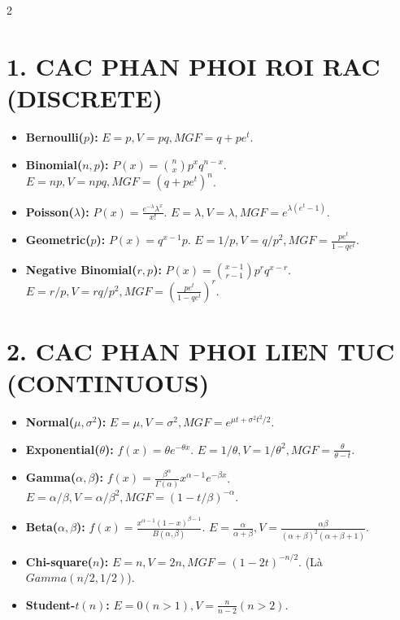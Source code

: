 \documentclass[8pt,a4paper]{article}
\begin{document}
\begin{multicols*}{2}


\section{1. CAC PHAN PHOI ROI RAC (DISCRETE)}
\begin{itemize}
    \item \textbf{Bernoulli($p$):} $E=p, V=pq, MGF=q+pe^t$.
    \item \textbf{Binomial($n, p$):} $P(x)=\binom{n}{x}p^x q^{n-x}$. $E=np, V=npq, MGF=(q+pe^t)^n$.
    \item \textbf{Poisson($\lambda$):} $P(x)=\frac{e^{-\lambda}\lambda^x}{x!}$. $E=\lambda, V=\lambda, MGF=e^{\lambda(e^t-1)}$.
    \item \textbf{Geometric($p$):} $P(x)=q^{x-1}p$. $E=1/p, V=q/p^2, MGF=\frac{pe^t}{1-qe^t}$.
    \item \textbf{Negative Binomial($r, p$):} $P(x)=\binom{x-1}{r-1}p^r q^{x-r}$. $E=r/p, V=rq/p^2, MGF=(\frac{pe^t}{1-qe^t})^r$.
\end{itemize}

\section{2. CAC PHAN PHOI LIEN TUC (CONTINUOUS)}
\begin{itemize}
    \item \textbf{Normal($\mu, \sigma^2$):} $E=\mu, V=\sigma^2, MGF=e^{\mu t + \sigma^2 t^2/2}$.
    \item \textbf{Exponential($\theta$):} $f(x)=\theta e^{-\theta x}$. $E=1/\theta, V=1/\theta^2, MGF=\frac{\theta}{\theta-t}$.
    \item \textbf{Gamma($\alpha, \beta$):} $f(x)=\frac{\beta^\alpha}{\Gamma(\alpha)}x^{\alpha-1}e^{-\beta x}$. $E=\alpha/\beta, V=\alpha/\beta^2, MGF=(1-t/\beta)^{-\alpha}$.
    \item \textbf{Beta($\alpha, \beta$):} $f(x)=\frac{x^{\alpha-1}(1-x)^{\beta-1}}{B(\alpha, \beta)}$. $E=\frac{\alpha}{\alpha+\beta}, V=\frac{\alpha\beta}{(\alpha+\beta)^2(\alpha+\beta+1)}$.
    \item \textbf{Chi-square($n$):} $E=n, V=2n, MGF=(1-2t)^{-n/2}$. (Là $Gamma(n/2, 1/2)$).
    \item \textbf{Student-$t(n)$:} $E=0 (n>1), V=\frac{n}{n-2} (n>2)$.
\end{itemize}


\end{multicols*}
\end{document}
